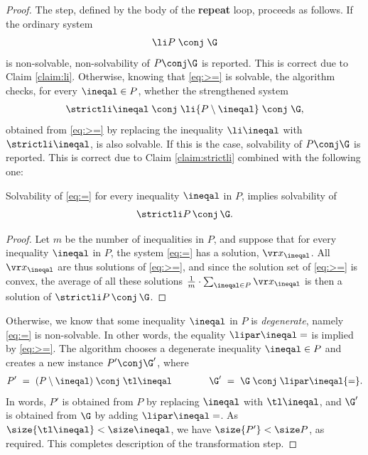 \begin{proof}
The step, defined by the body of the 
\textbf{repeat} loop, proceeds as follows.
If the ordinary system
\begin{align} \label{eq:>=}
\li P \; \conj \; \G
\end{align}
is non-solvable, 
non-solvability of $P\conj\G$ is reported.
This is correct due to Claim \ref{claim:li}.
%
Otherwise, knowing that \eqref{eq:>=} is solvable,
the algorithm checks, for every $\ineqal\in P$, whether 
the strengthened system 
\begin{align} \label{eq:=}
\strictli \ineqal \; \conj \; \li {P\setminus \ineqal} \; \conj \; \G,
\end{align}
obtained from \eqref{eq:>=} by replacing
the inequality $\li \ineqal$ with $\strictli \ineqal$, is also solvable.
If this is the case, solvability of $P \conj \G$ is reported. 
This is correct due to Claim \ref{claim:strictli} combined with the following one:
%
\begin{claim} \label{claim:=}
Solvability of \eqref{eq:=} for every inequality $\ineqal$ in $P$, implies solvability of
\begin{align}
\label{eq:>}
\strictli P \, \conj \, \G.
\end{align}
\end{claim}
%
\begin{proof}
Let $m$ be the number of inequalities in $P$, and
suppose that for every inequality $\ineqal$ in $P$, the system \eqref{eq:=}
has a solution, $\vr x_\ineqal$.
All $\vr x_\ineqal$ are thus solutions of \eqref{eq:>=}, and since
the solution set of \eqref{eq:>=} is convex,
the average of all these solutions
$
\frac 1 {m} \cdot \sum_{\ineqal\in P} \vr x_\ineqal
$
is then a solution of $\strictli P \, \conj \, \G$.
\end{proof}
%
Otherwise, we know that some
inequality $\ineqal$ in $P$ is \emph{degenerate}, namely
\eqref{eq:=} is non-solvable.
In other words, the equality $\lipar \ineqal =$
is implied by \eqref{eq:>=}.
The algorithm chooses a degenerate inequality $\ineqal\in P$ 
%
%
and creates a new instance $P' \conj \G'$, where
\begin{align*}
P' \  = \ (P \setminus \ineqal) \; \conj\; \tl \ineqal \qquad\qquad
\G' \  = \ \G \; \conj \; \lipar \ineqal {=}.
\end{align*}
%
In words, $P'$ is obtained from $P$ by replacing $\ineqal$ with $\tl \ineqal$,
and $\G'$ is obtained from $\G$ by adding $\lipar \ineqal =$.
As $\size {\tl \ineqal} < \size \ineqal$, we have $\size {P'} < \size P$, as required.
This completes description of the transformation step.


\end{proof}
